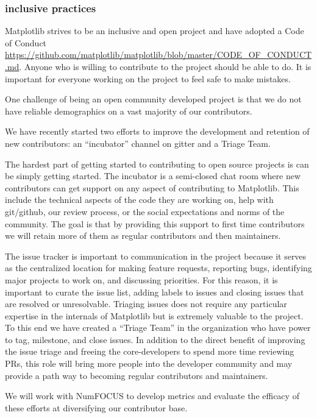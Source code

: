 \documentclass[12pt]{article}
\numberwithin{page}{section}
\begin{document}
\subsubsection{inclusive practices}

Matplotlib strives to be an inclusive and open project and have
adopted a Code of Conduct
\url{https://github.com/matplotlib/matplotlib/blob/master/CODE_OF_CONDUCT.md}. Anyone
who is willing to contribute to the project should be able to do.  It
is important for everyone working on the project to feel safe to make
mistakes.

One challenge of being an open community developed project is that we do not
have reliable demographics on a vast majority of our contributors.

We have recently started two efforts to improve the development and
retention of new contributors: an ``incubator'' channel on gitter and
a Triage Team.

The hardest part of getting started to contributing to open source
projects is can be simply getting started.  The incubator is a
semi-closed chat room where new contributors can get support on any
aspect of contributing to Matplotlib.  This include the technical
aspects of the code they are working on, help with git/github, our
review process, or the social expectations and norms of the community.  The
goal is that by providing this support to first time contributors we will
retain more of them as regular contributors and then maintainers.

The issue tracker is important to communication in the project because
it serves as the centralized location for making feature requests,
reporting bugs, identifying major projects to work on, and discussing
priorities.  For this reason, it is important to curate the issue
list, adding labels to issues and closing issues that are resolved or
unresolvable. Triaging issues does not require any particular
expertise in the internals of Matplotlib but is extremely valuable to
the project.  To this end we have created a ``Triage Team'' in the
organization who have power to tag, milestone, and close issues.  In
addition to the direct benefit of improving the issue triage and
freeing the core-developers to spend more time reviewing PRs, this
role will bring more people into the developer community and may
provide a path way to becoming regular contributors and maintainers.


We will work with NumFOCUS to develop metrics and evaluate the efficacy of
these efforts at diversifying our contributor base.
\end{document}
